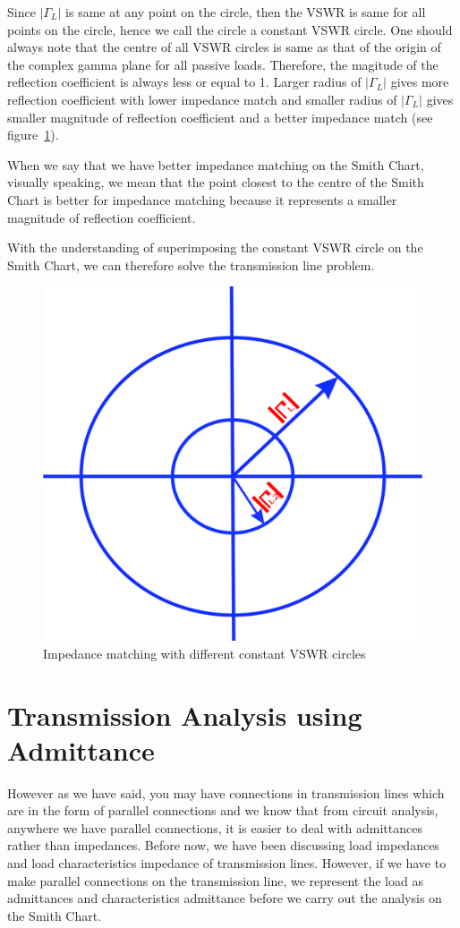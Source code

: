 Since $|\Gamma_L|$ is same at any point on the circle, then the VSWR is same for all points on the circle, hence we call the circle a constant VSWR circle. 
One should always note that the centre of all VSWR circles is same as that of the origin of  the complex gamma plane for all passive loads. Therefore, the magitude of the reflection coefficient is always less or equal to 1. Larger radius of $|\Gamma_L|$ gives more reflection coefficient with lower impedance match and smaller radius of  $|\Gamma_L|$ gives smaller magnitude of reflection coefficient and a better impedance match (see figure~\ref{fig:poiuyfd}).

When we say that we have better impedance matching on the Smith Chart, visually speaking, we mean that the point closest to the centre of the Smith Chart is better for impedance matching because it represents a smaller magnitude of reflection coefficient. 

With the understanding of superimposing the constant VSWR circle on the Smith Chart, we can therefore solve the transmission line problem.
\begin{figure}[h]
\centering
\includegraphics[width=0.57\linewidth]{./graphics/poiuyfd}
\caption{Impedance matching with different constant VSWR circles}
\label{fig:poiuyfd}
\end{figure}

\section{Transmission Analysis using Admittance}
However as we have said, you may have connections in transmission lines which are in the form of parallel connections and we know that from circuit analysis, anywhere we have parallel connections, it is easier to deal with admittances rather than impedances. Before now, we have been discussing load impedances and load characteristics impedance of transmission lines. However, if we have to make parallel connections on the transmission line, we represent the load as admittances and characteristics admittance before we carry out the analysis on the Smith Chart. 


